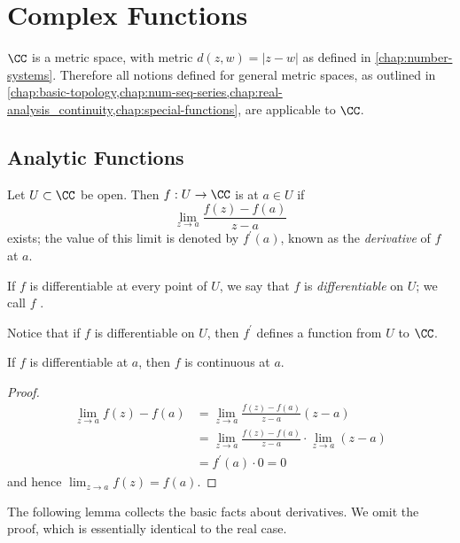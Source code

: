 \chapter{Complex Functions}\label{chap:complex-functions}
\begin{summary}
\item 
\end{summary}

$\CC$ is a metric space, with metric $d(z,w)=|z-w|$ as defined in \cref{chap:number-systems}. Therefore all notions defined for general metric spaces, as outlined in \cref{chap:basic-topology,chap:num-seq-series,chap:real-analysis_continuity,chap:special-functions}, are applicable to $\CC$.

\section{Analytic Functions}
\begin{definition}
Let $U\subset\CC$ be open. Then $f:U\to\CC$ is  at $a\in U$ if
\[\lim_{z\to a}\frac{f(z)-f(a)}{z-a}\]
exists; the value of this limit is denoted by $f^\prime(a)$, known as the \emph{derivative} of $f$ at $a$.

If $f$ is differentiable at every point of $U$, we say that $f$ is \emph{differentiable} on $U$; we call $f$ .
\end{definition}

Notice that if $f$ is differentiable on $U$, then $f^\prime$ defines a function from $U$ to $\CC$.

\begin{lemma}
If $f$ is differentiable at $a$, then $f$ is continuous at $a$.
\end{lemma}

\begin{proof}
\begin{align*}
\lim_{z\to a}f(z)-f(a)
&=\lim_{z\to a}\frac{f(z)-f(a)}{z-a}(z-a)\\
&=\lim_{z\to a}\frac{f(z)-f(a)}{z-a}\cdot\lim_{z\to a}(z-a)\\
&=f^\prime(a)\cdot0=0
\end{align*}
and hence $\displaystyle\lim_{z\to a}f(z)=f(a)$.
\end{proof}

The following lemma collects the basic facts about derivatives. We omit the proof, which is essentially identical to the real case.

